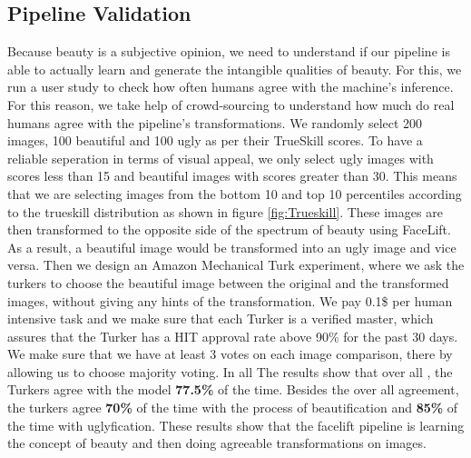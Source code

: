 \subsection{Pipeline Validation}
Because beauty is a subjective opinion, we need to understand if our pipeline is able to actually learn and generate the intangible qualities of beauty. For this, we run a user study to check how often humans agree with the machine's inference. For this reason, we take help of crowd-sourcing to understand how much do real humans agree with the pipeline's transformations.
We randomly select 200 images, 100 beautiful  and 100 ugly as per their TrueSkill scores. To have a reliable seperation in terms of visual appeal, we only select ugly images with scores less than 15 and beautiful images with scores greater than 30. This means that we are selecting images from the bottom 10 and top 10 percentiles according to the trueskill distribution as shown in figure \ref{fig:Trueskill}. These images are then transformed to the opposite side of the spectrum of beauty using FaceLift. As a result, a beautiful image would be transformed into an ugly image and vice versa. Then we design an Amazon Mechanical Turk experiment, where we ask the turkers to choose the beautiful image between the original and the transformed images, without giving any hints of the transformation. We pay 0.1\$ per human intensive task and we make sure that each Turker is a verified master, which assures that the Turker has a HIT approval rate above 90\% for the past 30 days. We make sure that we have at least 3 votes on each image comparison, there by allowing us to choose majority voting. In all  The results show that over all , the Turkers agree with the model \textbf{77.5\%} of the time. Besides the over all agreement, the turkers agree \textbf{70\%} of the time with the process of beautification and \textbf{85\%} of the time with uglyfication. These results show that the facelift pipeline is learning the concept of beauty and then doing agreeable transformations on images.  